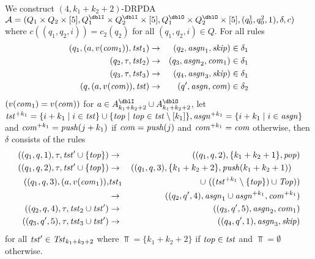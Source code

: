 We construct $(4,k_1+k_2+2)$-DRPDA
$\calA=(Q_1\times Q_2\times[5], Q^\dblI_1\times Q^\dblI_2\times[5], Q^\dblO_1\times Q^\dblO_2\times[5], (q^1_0, q^2_0, 1), \delta, c)$
where $c((q_1,q_2,i))=c_2(q_2)$ for all $(q_1,q_2,i)\in Q$.
For all rules
\begin{eqnarray}
(q_1, (a,v(\mathit{com}_1)), \mathit{tst}_1) &\to & (q_2,\mathit{asgn}_1, \mathit{skip})\in\delta_1\label{eq: LkS1}\\
(q_2, \tau, \mathit{tst}_2) &\to & (q_3,\mathit{asgn}_2, \mathit{com}_1)\in\delta_1\label{eq: LkS2}\\
(q_3, \tau, \mathit{tst}_3) &\to & (q_4,\mathit{asgn}_3, \mathit{skip})\in\delta_1\label{eq: LkS3}\\
(q, (a,v(\mathit{com})), \mathit{tst}) &\to & (q',\mathit{asgn}, \mathit{com})\in\delta_2\label{eq: LkS4}
\end{eqnarray}
$(v(\mathit{com}_1)=v(\mathit{com}))$ for $a\in A^\dblI_{k_1+k_2+2}\cup A^\dblO_{k_1+k_2+2}$,
let $\mathit{tst}^{+ k_1}=\{i+k_1\mid i\in\mathit{tst}\}\cup\{\mathit{top}\mid\mathit{top}\in\mathit{tst}\setminus[k_1]\}, \mathit{asgn}^{+ k_1}=\{i+k_1\mid i\in\mathit{asgn}\}$ and $\mathit{com}^{+ k_1} = \mathit{push}(j+k_1)$ if $\mathit{com}=\mathit{push}(j)$ and $\mathit{com}^{+ k_1} = \mathit{com}$ otherwise, then $\delta$ consists of the rules
\begin{eqnarray}
((q_1, q, 1), \tau, \mathit{tst}'\cup\{\mathit{top}\}) &\to & ((q_1, q, 2), \{k_1+k_2+1\}, \mathit{pop})\label{eq: LkS5}\\
((q_1, q, 2), \tau, \mathit{tst}'\cup\{\mathit{top}\}) &\to & ((q_1, q, 3), \{k_1+k_2+2\}, \mathit{push}(k_1+k_2+1)) \quad\label{eq: LkS6}\\
((q_1, q, 3), (a,v(\mathit{com}_1)),
&\mathit{tst}_1 &\cup\ ((\mathit{tst}^{+ k_1}\setminus\{\mathit{top}\})\cup\mathit{Top})) \nonumber\\
 &\to & ((q_2, q', 4), \mathit{asgn}_1\cup\mathit{asgn}^{+ k_1}, \mathit{com}^{+ k_1})\label{eq: LkS7}\\
((q_2, q, 4), \tau, \mathit{tst}_2\cup\mathit{tst}') &\to & ((q_3, q', 5), \mathit{asgn}_2, \mathit{com}_1)\label{eq: LkS8}\\
((q_3, q', 5), \tau, \mathit{tst}_3\cup\mathit{tst}') &\to & ((q_4, q', 1), \mathit{asgn}_3, \mathit{skip})\label{eq: LkS9}
\end{eqnarray}
for all $\mathit{tst}'\in\mathit{Tst}_{k_1+k_2+2}$ where
$\Top=\{k_1+k_2+2\}$ if $\mathit{top}\in\mathit{tst}$ and $\Top=\emptyset$ otherwise.

